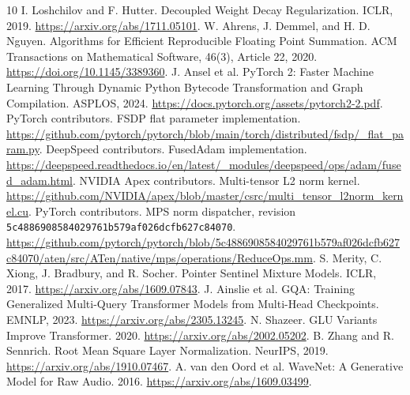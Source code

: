 \documentclass[11pt]{article}
\newcommand{\code}[1]{\texttt{#1}}
\begin{document}
\begin{thebibliography}{10}
 I. Loshchilov and F. Hutter. Decoupled Weight Decay
Regularization. ICLR, 2019. \url{https://arxiv.org/abs/1711.05101}.
 W. Ahrens, J. Demmel, and H. D. Nguyen. Algorithms for
Efficient Reproducible Floating Point Summation. ACM Transactions on
Mathematical Software, 46(3), Article 22, 2020.
\url{https://doi.org/10.1145/3389360}.
 J. Ansel et al. PyTorch 2: Faster Machine Learning Through
Dynamic Python Bytecode Transformation and Graph Compilation. ASPLOS, 2024.
\url{https://docs.pytorch.org/assets/pytorch2-2.pdf}.
 PyTorch contributors. FSDP flat parameter implementation.
\url{https://github.com/pytorch/pytorch/blob/main/torch/distributed/fsdp/_flat_param.py}.
 DeepSpeed contributors. FusedAdam implementation.
\url{https://deepspeed.readthedocs.io/en/latest/_modules/deepspeed/ops/adam/fused_adam.html}.
 NVIDIA Apex contributors. Multi-tensor L2 norm kernel.
\url{https://github.com/NVIDIA/apex/blob/master/csrc/multi_tensor_l2norm_kernel.cu}.
 PyTorch contributors. MPS norm dispatcher, revision
\\\code{5c4886908584029761b579af026dcfb627c84070}.
\url{https://github.com/pytorch/pytorch/blob/5c4886908584029761b579af026dcfb627c84070/aten/src/ATen/native/mps/operations/ReduceOps.mm}.
 S. Merity, C. Xiong, J. Bradbury, and R. Socher. Pointer
Sentinel Mixture Models. ICLR, 2017. \url{https://arxiv.org/abs/1609.07843}.
 J. Ainslie et al. GQA: Training Generalized Multi-Query Transformer
Models from Multi-Head Checkpoints. EMNLP, 2023. \url{https://arxiv.org/abs/2305.13245}.
 N. Shazeer. GLU Variants Improve Transformer. 2020.
\url{https://arxiv.org/abs/2002.05202}.
 B. Zhang and R. Sennrich. Root Mean Square Layer Normalization.
NeurIPS, 2019. \url{https://arxiv.org/abs/1910.07467}.
 A. van den Oord et al. WaveNet: A Generative Model for Raw
Audio. 2016. \url{https://arxiv.org/abs/1609.03499}.
\end{thebibliography}

\appendix
\end{document}
